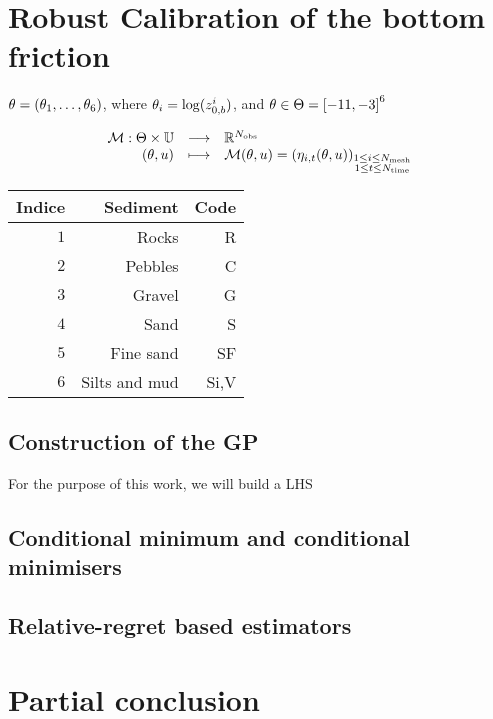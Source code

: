 \documentclass[../../Main_ManuscritThese.tex]{subfiles}
\newcommand{\zob}{z_{0,b}}
\begin{document}
\clearpage
\section{Robust Calibration of the bottom friction}
$\theta=\left(\theta_1,\dots,\theta_6\right)$, where $\kk_i = \log(\zob^i)$,
and $\KK \in \Kspace = \interval{-11}{-3}^6$

\begin{equation}
  \begin{array}{rcl}
    \mathcal{M}: \Theta \times \mathbb{U} &\longrightarrow& \mathbb{R}^{N_{\mathrm{obs}}} \\
    (\theta, u)& \longmapsto & \mathcal{M}(\theta, u) = \left(\eta_{i,t}(\theta, u)\right)_{\substack{1 \leq i \leq N_{\mathrm{mesh}} \\ 1 \leq t \leq N_{\mathrm{time}}}} \\ 
  \end{array}
\end{equation}

\begin{table}[!h]
  \centering
  \begin{tabular}{rrr} \toprule
    Indice & Sediment & Code  \\ \midrule
    $1$ & Rocks & R \\
    $2$ & Pebbles & C \\
    $3$ & Gravel & G \\
    $4$ & Sand & S \\
    $5$ & Fine sand & SF \\
    $6$ & Silts and mud & Si,V \\ \bottomrule
  \end{tabular}
\end{table}
\subsection{Construction of the GP}
\label{ssec:croco_construction_gp}
For the purpose of this work, we will build a LHS
\subsection{Conditional minimum and conditional minimisers}
\label{ssec:croco_cond_minimum_minimisers}
\subsection{Relative-regret based estimators}

\section{Partial conclusion}
\end{document}
